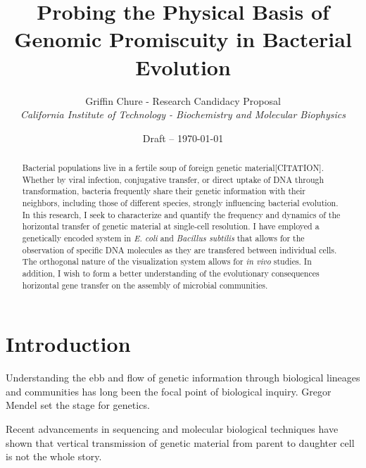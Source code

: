 

\title{Probing the Physical Basis of Genomic Promiscuity in Bacterial Evolution}
\author{Griffin Chure - Research Candidacy Proposal\\
	\textit{California Institute of Technology - Biochemistry and Molecular
	Biophysics}}
\date{Draft -- \today}


\maketitle
\begin{abstract}
	Bacterial populations live in a fertile soup of foreign genetic
	material[CITATION]. Whether by viral infection, conjugative transfer, or
	direct uptake of DNA through transformation, bacteria frequently share
	their genetic information with their neighbors, including those of
	different species, strongly influencing bacterial evolution. In this
	research, I seek to characterize and quantify the frequency and dynamics
	of the horizontal transfer of genetic material at single-cell
	resolution. I have employed a genetically encoded system in \textit{E.
	coli} and \textit{Bacillus subtilis} that allows for the observation of
	specific DNA molecules as they are transfered between individual cells.
	The orthogonal nature of the visualization system allows for \textit{in
	vivo} studies. In addition, I wish to form a better understanding of the
	evolutionary consequences horizontal gene transfer on the assembly of
	microbial communities. 
\end{abstract}

\section*{Introduction}
Understanding the ebb and flow of genetic information through biological
lineages and communities has long been the focal point of biological inquiry.
Gregor Mendel set the stage for genetics. \cite{Syvanen:2012jn}

Recent advancements in sequencing and molecular biological techniques have shown
that vertical transmission of genetic material from parent to daughter cell is
not the whole story. 

